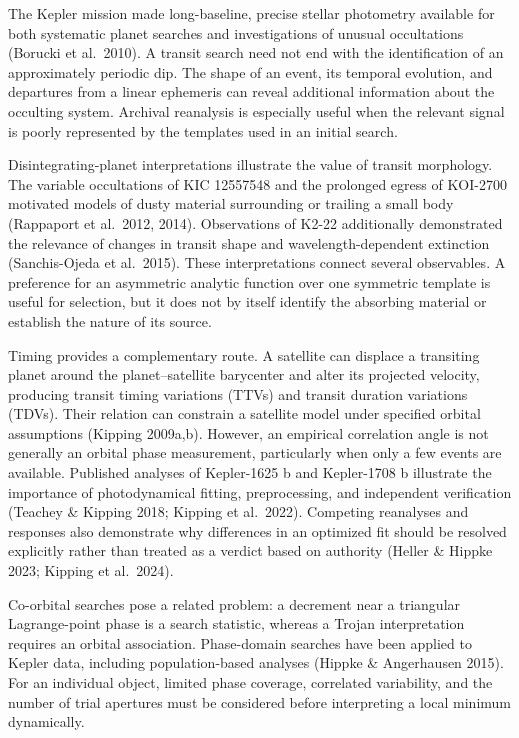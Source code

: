\documentclass[
  english,
]{article}
\begin{document}
The Kepler mission made long-baseline, precise stellar photometry
available for both systematic planet searches and investigations of
unusual occultations (Borucki et al.~2010). A transit search need not
end with the identification of an approximately periodic dip. The shape
of an event, its temporal evolution, and departures from a linear
ephemeris can reveal additional information about the occulting system.
Archival reanalysis is especially useful when the relevant signal is
poorly represented by the templates used in an initial search.

Disintegrating-planet interpretations illustrate the value of transit
morphology. The variable occultations of KIC 12557548 and the prolonged
egress of KOI-2700 motivated models of dusty material surrounding or
trailing a small body (Rappaport et al.~2012, 2014). Observations of
K2-22 additionally demonstrated the relevance of changes in transit
shape and wavelength-dependent extinction (Sanchis-Ojeda et al.~2015).
These interpretations connect several observables. A preference for an
asymmetric analytic function over one symmetric template is useful for
selection, but it does not by itself identify the absorbing material or
establish the nature of its source.

Timing provides a complementary route. A satellite can displace a
transiting planet around the planet--satellite barycenter and alter its
projected velocity, producing transit timing variations (TTVs) and
transit duration variations (TDVs). Their relation can constrain a
satellite model under specified orbital assumptions (Kipping 2009a,b).
However, an empirical correlation angle is not generally an orbital
phase measurement, particularly when only a few events are available.
Published analyses of Kepler-1625 b and Kepler-1708 b illustrate the
importance of photodynamical fitting, preprocessing, and independent
verification (Teachey \& Kipping 2018; Kipping et al.~2022). Competing
reanalyses and responses also demonstrate why differences in an
optimized fit should be resolved explicitly rather than treated as a
verdict based on authority (Heller \& Hippke 2023; Kipping et al.~2024).

Co-orbital searches pose a related problem: a decrement near a
triangular Lagrange-point phase is a search statistic, whereas a Trojan
interpretation requires an orbital association. Phase-domain searches
have been applied to Kepler data, including population-based analyses
(Hippke \& Angerhausen 2015). For an individual object, limited phase
coverage, correlated variability, and the number of trial apertures must
be considered before interpreting a local minimum dynamically.
\end{document}
